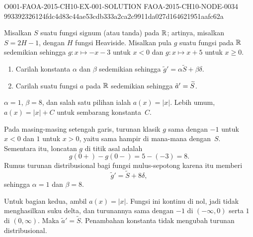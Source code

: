 \begin{o001solution}
  {O001-FAOA-2015-CH10-EX-001-SOLUTION}
  {FAOA-2015-CH10-NODE-0034}
  {993392326124fdc4d83c44ae53cdb333a2ca2c9911da027d164621951aafc62a}
\begin{o001statement}
Misalkan $S$ suatu fungsi signum (atau tanda) pada $\mathbb{R}$; artinya, misalkan $S = 2H - 1$, dengan $H$ fungsi Heaviside.
Misalkan pula $g$ suatu fungsi pada $\mathbb{R}$ sedemikian sehingga $g\colon x \mapsto -x - 3$ untuk $x < 0$ dan $g\colon x \mapsto x + 5$ untuk $x \ge 0$.
   \begin{enumerate}[label=\rm{(\alph*)}]
     \item Carilah konstanta $\alpha$ dan $\beta$ sedemikian sehingga ${\tilde g}' = \alpha \widetilde S + \beta \delta$.
     \item Carilah suatu fungsi $a$ pada $\mathbb{R}$ sedemikian sehingga ${\tilde a}' = \widetilde{S}$.
   \end{enumerate}
\end{o001statement}
\begin{o001answer}
$\alpha=1$, $\beta=8$, dan salah satu pilihan ialah $a(x)=\lvert x\rvert$.
Lebih umum, $a(x)=\lvert x\rvert+C$ untuk sembarang konstanta~$C$.
\end{o001answer}
\begin{o001proof}
Pada masing-masing setengah garis, turunan klasik $g$ sama dengan $-1$ untuk
$x<0$ dan $1$ untuk $x>0$, yaitu sama hampir di mana-mana dengan~$S$.
Sementara itu, loncatan $g$ di titik asal adalah
\[
  g(0+)-g(0-)=5-(-3)=8.
\]
Rumus turunan distribusional bagi fungsi mulus-sepotong karena itu memberi
\[
  {\tilde g}'=\widetilde S+8\delta,
\]
sehingga $\alpha=1$ dan $\beta=8$.

Untuk bagian kedua, ambil $a(x)=\lvert x\rvert$. Fungsi ini kontinu di nol,
jadi tidak menghasilkan suku delta, dan turunannya sama dengan $-1$ di
$(-\infty,0)$ serta $1$ di $(0,\infty)$. Maka
${\tilde a}'=\widetilde S$. Penambahan konstanta tidak mengubah turunan
distribusional.
\end{o001proof}
\end{o001solution}

